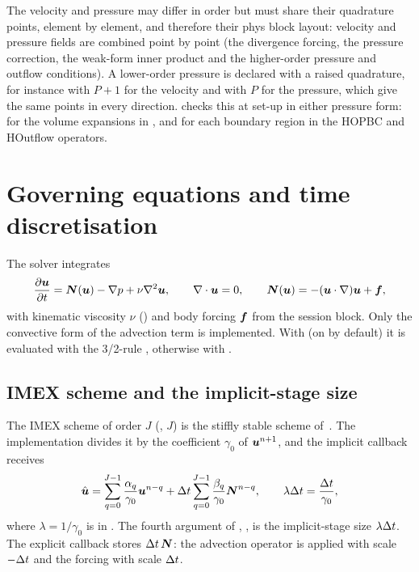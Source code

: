 The velocity and pressure may differ in order but must share their
quadrature points, element by element, and therefore their phys block
layout: velocity and pressure fields are combined point by point (the
divergence forcing, the pressure correction, the weak-form inner product and
the higher-order pressure and outflow conditions). A lower-order pressure is
declared with a raised quadrature, for instance  with
$P+1$ for the velocity and  with
$P$ for the pressure, which give the same points in every
direction.  checks this at set-up in
either pressure form: for the volume expansions in
, and for each
boundary region in the HOPBC and HOutflow operators.

\section{Governing equations and time discretisation}
\label{sec:incns-time}

The solver integrates
\begin{equation}
  \frac{\partial\boldsymbol{u}}{\partial t} = \boldsymbol{N}(\boldsymbol{u}) - \nabla p
  + \nu\nabla^2\boldsymbol{u},\qquad \nabla\cdot\boldsymbol{u} = 0,\qquad
  \boldsymbol{N}(\boldsymbol{u}) = -(\boldsymbol{u}\cdot\nabla)\boldsymbol{u} + \boldsymbol{f},
  \label{eq:incns-ns}
\end{equation}
with kinematic viscosity $\nu$ () and body forcing $\boldsymbol{f}$
from the session  block. Only the convective form of the
advection term is implemented. With  (on by
default) it is evaluated with the 3/2-rule ,
otherwise with .

\subsection{IMEX scheme and the implicit-stage size}

The IMEX scheme of order $J$ (, $J$) is the
stiffly stable scheme of~\cite{Karniadakis1991}. The implementation divides
it by the coefficient $\gamma_0$ of $\boldsymbol{u}^{n+1}$, and the implicit
callback receives
\begin{equation}
  \hat{\boldsymbol{u}} = \sum_{q=0}^{J-1}\frac{\alpha_q}{\gamma_0}\boldsymbol{u}^{n-q}
  + \Delta t\sum_{q=0}^{J-1}\frac{\beta_q}{\gamma_0}\boldsymbol{N}^{n-q},
  \qquad \lambda\Delta t = \frac{\Delta t}{\gamma_0},
  \label{eq:incns-uhat}
\end{equation}
where $\lambda=1/\gamma_0$ is  in . The
fourth argument of , , is
the implicit-stage size $\lambda\Delta t$. The explicit
callback stores $\Delta t\,\boldsymbol{N}$: the advection operator is applied
with scale $-\Delta t$ and the forcing with scale $\Delta t$.


